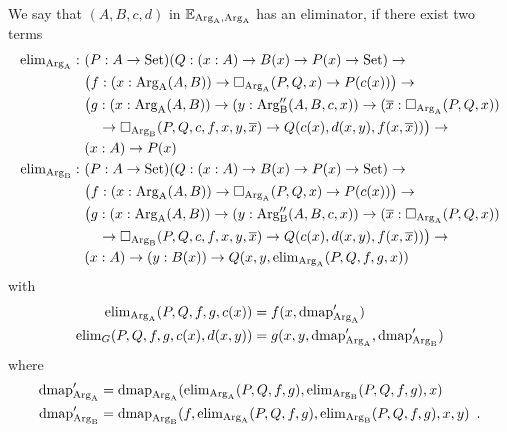 \documentclass[orivec,envcountsame, ,envcountsect]{llncs}
\begin{document}
\begin{definition}
  
  We say that $(A, B, c, d)$ in $\mathbb{E}_{\text{Arg}_{\text{A}}, \text{Arg}_{\text{A}}}$ has an
  eliminator, if there exist two terms 
\begin{align*}
  \text{elim}_{\text{Arg}_{\text{A}}} :\ & (P : A \to \text{Set})(Q : (x : A) \to B(x) \to P(x) \to \text{Set}) \to \\
  & \big(f : (x : \text{Arg}_{\text{A}}(A, B)) \to \Box_{\text{Arg}_{\text{A}}}(P, Q, x) \to P(c(x))\big) \to \\
  & \big( g : (x : \text{Arg}_{\text{A}}(A, B)) \to (y : \text{Arg}_{\text{B}}''(A, B, c, x)) \to
  (\overline{x} : \Box_{\text{Arg}_{\text{A}}}(P, Q, x))  \\
  & \quad \to  \Box_{\text{Arg}_{\text{B}}}(P, Q, c, f, x, y, \overline{x}) \to 
     Q(c(x), d(x, y), f(x, \overline{x}))\big) \to \\
  & (x : A) \to P(x) \\
  \text{elim}_{\text{Arg}_{\text{B}}} :\ & (P : A \to \text{Set})(Q : (x : A) \to B(x) \to P(x) \to \text{Set}) \to \\
  & \big(f : (x : \text{Arg}_{\text{A}}(A, B)) \to \Box_{\text{Arg}_{\text{A}}}(P, Q, x) \to P(c(x))\big) \to \\
  & \big( g : (x : \text{Arg}_{\text{A}}(A, B)) \to (y : \text{Arg}_{\text{B}}''(A, B, c, x)) \to
  (\overline{x} : \Box_{\text{Arg}_{\text{A}}}(P, Q, x))  \\
  & \quad \to  \Box_{\text{Arg}_{\text{B}}}(P, Q, c, f, x, y, \overline{x}) \to 
     Q(c(x), d(x, y), f(x, \overline{x}))\big) \to \\
  & (x : A) \to (y : B(x)) \to Q(x, y, \text{elim}_{\text{Arg}_{\text{A}}}(P, Q, f, g, x))
\end{align*}
with 
\begin{align*}
\text{elim}_{\text{Arg}_{\text{A}}}(P, Q, f, g, c(x)) &= f(x, \text{dmap}_{\text{Arg}_{\text{A}}}') \\
 \text{elim}_G(P, Q, f, g, c(x), d(x, y)) &=
 g(x, y, \text{dmap}_{\text{Arg}_{\text{A}}}',  \text{dmap}_{\text{Arg}_{\text{B}}}')
\end{align*}
where 
\begin{align*}
\text{dmap}_{\text{Arg}_{\text{A}}}' &= \text{dmap}_{\text{Arg}_{\text{A}}}(\text{elim}_{\text{Arg}_{\text{A}}}(P, Q, f, g), \text{elim}_{\text{Arg}_{\text{B}}}(P, Q, f, g), x) \\
\text{dmap}_{\text{Arg}_{\text{B}}}' &= \text{dmap}_{\text{Arg}_{\text{B}}}(f, \text{elim}_{\text{Arg}_{\text{A}}}(P, Q, f, g), \text{elim}_{\text{Arg}_{\text{B}}}(P, Q, f, g), x, y) \enspace .
\end{align*}





\end{definition}

\end{document}
